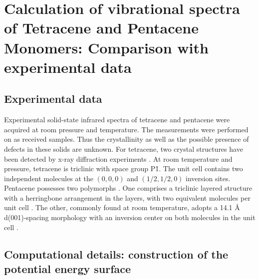 \singlespacing
\section{Calculation of vibrational spectra of Tetracene and Pentacene Monomers: Comparison with experimental data}
\subsection{Experimental data}

Experimental solid-state infrared spectra of tetracene and pentacene \cite{michaelian2012far} were acquired at room pressure and temperature. The measurements were performed on as received samples. Thus the crystallinity as well as the possible presence of defects in these solids are unknown. For tetracene, two crystal structures have been detected by x-ray diffraction experiments \cite{venuti2004phonons}. At room temperature and pressure, tetracene is triclinic \cite{campbell1962crystal} with space group P\={1}. The unit cell contains two independent molecules at the $(0,0,0)$ and $(1/2,1/2,0)$ inversion sites. Pentacene possesses two polymorphs \cite{venuti2002probing,brillante2005characterization}. One comprises a triclinic layered structure with a herringbone arrangement in the layers, with two equivalent molecules per unit cell \cite{campbell1961crystal}.  The other, commonly found at room temperature, adopts a 14.1 Å d(001)-spacing morphology with an inversion center on both molecules in the unit cell \cite{holmes1999nature,siegrist2001enhanced,mattheus2001polymorphism,mattheus2003identification,mattheus2003modeling}.

\singlespacing
\subsection{Computational details: construction of the potential energy surface}

